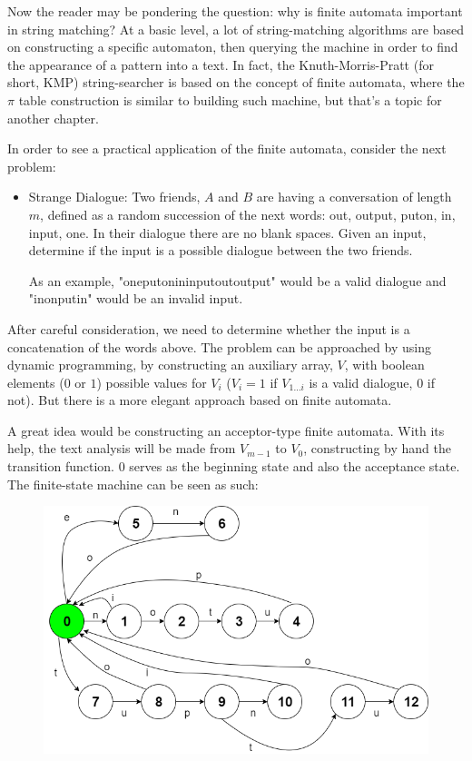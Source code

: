 \documentclass[letterpaper]{article}
\begin{document}

Now the reader may be pondering the question: why is finite automata important in string matching? At a basic level, a lot of string-matching algorithms are based on constructing a specific automaton, then querying the machine in order to find the appearance of a pattern into a text. In fact, the Knuth-Morris-Pratt (for short, KMP) string-searcher is based on the concept of finite automata, where the $\pi$ table construction is similar to building such machine, but that's a topic for another chapter. 

In order to see a practical application of the finite automata, consider the next problem:

\begin{itemize}
    \item Strange Dialogue: Two friends, $A$ and $B$ are having a conversation of length $m$, defined as a random succession of the next words: out, output, puton, in, input, one. In their dialogue there are no blank spaces. Given an input, determine if the input is a possible dialogue between the two friends.

    As an example, "oneputonininputoutoutput" would be a valid dialogue and "inonputin" would be an invalid input.
\end{itemize}

After careful consideration, we need to determine whether the input is a concatenation of the words above. The problem can be approached by using dynamic programming, by constructing an auxiliary array, $V$, with boolean elements ($0$ or $1$) possible values for $V_i$ ($V_i = 1$ if $ V_{1 \dots i}$ is a valid dialogue, $0$ if not). But there is a more elegant approach based on finite automata.

A great idea would be constructing an acceptor-type finite automata. With its help, the text analysis will be made from $V_{m - 1}$ to $V_0$, constructing by hand the transition function. $0$ serves as the beginning state and also the acceptance state. The finite-state machine can be seen as such:

\begin{figure} [h!]
\centering
\includegraphics[width=1\textwidth]{pngOfDiagrams/strangedialogue.png}
\end{figure}
\end{document}

